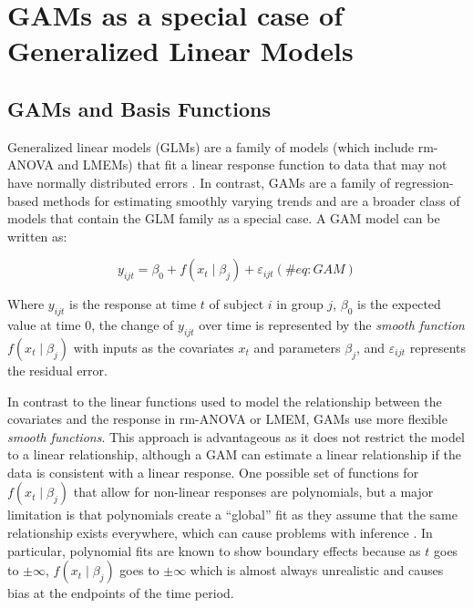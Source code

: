 \documentclass[Royal,times,sagev]{sagej}
\begin{document}
\hypertarget{GAM-theory}{%
\section{GAMs as a special case of Generalized Linear
Models}\label{GAM-theory}}

\hypertarget{gams-and-basis-functions}{%
\subsection{GAMs and Basis Functions}\label{gams-and-basis-functions}}

Generalized linear models (GLMs) are a family of models (which include
rm-ANOVA and LMEMs) that fit a linear response function to data that may
not have normally distributed errors \citep{nelder1972}. In contrast,
GAMs are a family of regression-based methods for estimating smoothly
varying trends and are a broader class of models that contain the GLM
family as a special case\citep{simpson2018, wood2017, hastie1987}. A GAM
model can be written as:

\begin{equation}
  y_{ijt}=\beta_0+f(x_t\mid \beta_j)+\varepsilon_{ijt}
  (\#eq:GAM)
\end{equation}

Where \(y_{ijt}\) is the response at time \(t\) of subject \(i\) in
group \(j\), \(\beta_0\) is the expected value at time 0, the change of
\(y_{ijt}\) over time is represented by the \emph{smooth function}
\(f(x_t\mid \beta_j)\) with inputs as the covariates \(x_t\) and
parameters \(\beta_j\), and \(\varepsilon_{ijt}\) represents the
residual error.

In contrast to the linear functions used to model the relationship
between the covariates and the response in rm-ANOVA or LMEM, GAMs use
more flexible \emph{smooth functions}. This approach is advantageous as
it does not restrict the model to a linear relationship, although a GAM
can estimate a linear relationship if the data is consistent with a
linear response. One possible set of functions for
\(f(x_t\mid \beta_j)\) that allow for non-linear responses are
polynomials, but a major limitation is that polynomials create a
``global'' fit as they assume that the same relationship exists
everywhere, which can cause problems with inference \citep{beck1998}. In
particular, polynomial fits are known to show boundary effects because
as \(t\) goes to \(\pm \infty\), \(f(x_t \mid \beta_j)\) goes to
\(\pm \infty\) which is almost always unrealistic and causes bias at the
endpoints of the time period.
\end{document}
